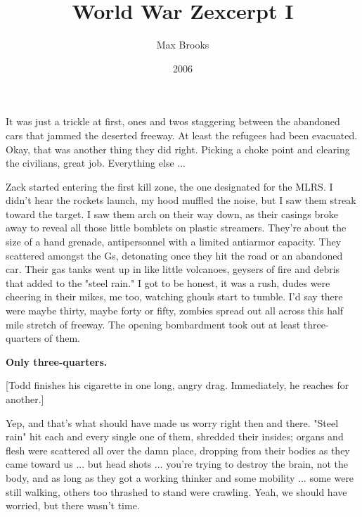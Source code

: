 \documentclass[10pt,a5paper,twoside]{book}
\newcommand{\subtitle}[1]{\vspace{10pt}\newline\normalsize\plantin #1}
\begin{document}
\title{World War Z\subtitle{excerpt I}}
\date{2006}
\author{Max Brooks}


\maketitle


\chapter*{}    
\noindent\linenumbers 

It was just a trickle at first, ones and twos staggering between the abandoned cars that jammed the deserted freeway. At least the refugees had been evacuated. Okay, that was another thing they did right. Picking a choke point and clearing the civilians, great job. Everything else ...

Zack started entering the first kill zone, the one designated for the MLRS. I didn't hear the rockets launch, my hood muffled the noise, but I saw them streak toward the target. I saw them arch on their way down, as their casings broke away to reveal all those little bomblets on plastic streamers. They're about the size of a hand grenade, antipersonnel with a limited antiarmor capacity. They scattered amongst the Gs, detonating once they hit the road or an abandoned car. Their gas tanks went up in like little volcanoes, geysers of fire and debris that added to the "steel rain." I got to be honest, it was a rush, dudes were cheering in their mikes, me too, watching ghouls start to tumble. I'd say there were maybe thirty, maybe forty or fifty, zombies spread out all across this half mile stretch of freeway. The opening bombardment took out at least three-quarters of them.

\textbf{Only three-quarters.}

[Todd finishes his cigarette in one long, angry drag. Immediately, he reaches for another.]

Yep, and that's what should have made us worry right then and there. "Steel rain" hit each and every single one of them, shredded their insides; organs and flesh were scattered all over the damn place, dropping from their bodies as they came toward us ... but head shots ... you're trying to destroy the brain, not the body, and as long as they got a working thinker and some mobility ... some were still walking, others too thrashed to stand were crawling. Yeah, we should have worried, but there wasn't time.
\end{document}
